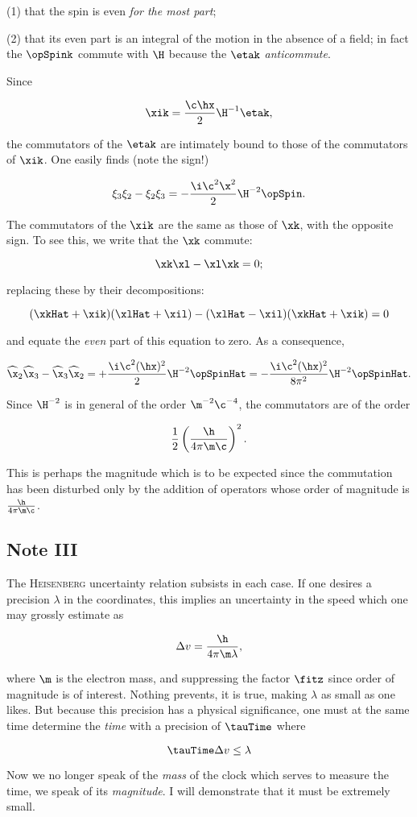 \documentclass{article}
\newcommand{\nc}[2]{
  \newcommand{#1}{#2}
}
\newcommand{\rc}[2]{
  \renewcommand{#1}{#2}
}
\newcommand{\uequ}[1]{
\begin{equation*}
#1
\end{equation*}
}
\newcommand{\var}[1]{#1}
\newcommand{\inv}[1]{\frac{1}{#1}}
\newcommand{\opinv}[1]{{#1}^{-1}}
\newcommand{\hatted}[1]{\widehat{#1}}
\renewcommand{\it}[1]{\textit{#1}}
\renewcommand{\sc}[1]{\textsc{#1}}
\newcommand{\xiX}[1]{\var{\xi}_{#1}}
\begin{document}
(1) that the spin is even \it{for the most part};

(2) that its even part is an integral of the motion in the absence of a field; in fact the $\opSpink$ commute with $\H$ because the $\etak$ \it{anticommute}.

Since
\uequ{
\xik=\frac{\c\hx}{2}\opinv{\H}\etak,
}
the commutators of the $\etak$ are intimately bound to those of the commutators of $\xik$. One easily finds (note the sign!)
\uequ{
\xiX{3}\xiX{2} - \xiX{2}\xiX{3} = -\frac{\i\c^2\x^2}{2}\H^{-2}\opSpin.
}

The commutators of the $\xik$ are the same as those of $\xk$, with the opposite sign. To see this, we write that the $\xk$ commute:
\uequ{
\xk\xl - \xl\xk = 0;
}
replacing these by their decompositions:
\uequ{
(\xkHat + \xik)(\xlHat + \xil) - (\xlHat - \xil)(\xkHat + \xik)=0
}
and equate the \it{even} part of this equation to zero. As a consequence,

\newcommand{\xXHat}[1]{\hatted{\x}_{#1}}

\uequ{
\xXHat{2}\xXHat{3} - \xXHat{3}\xXHat{2} = +\frac{\i\c^2(\hx)^2}{2}\H^{-2}\opSpinHat
 = -\frac{\i\c^2(\hx)^2}{8\pi^2}\H^{-2}\opSpinHat.
}
Since $\H^{-2}$ is in general of the order $\m^{-2}\c^{-4}$, the commutators are of the order
\uequ{
\inv{2}\left(\frac{\h}{4\pi\m\c}\right)^2.
}

This is perhaps the magnitude which is to be expected since the commutation has been disturbed only by the addition of operators whose order of magnitude is $\frac{\h}{4\pi\m\c}$.

\subsection{Note III}

\rc{\v}{\var{v}}
\nc{\lam}{\var{\lambda}}

The \sc{Heisenberg} uncertainty relation subsists in each case. If one desires a precision $\lam$ in the coordinates, this implies an uncertainty in the speed which one may grossly estimate as
\uequ{
\Delta\v = \frac{\h}{4\pi\m\lam},
}
where $\m$ is the electron mass, and suppressing the factor $\fitz$ since order of magnitude is of interest. Nothing prevents, it is true, making $\lam$ as small as one likes. But because this precision has a physical significance, one must at the same time determine the \it{time} with a precision of $\tauTime$ where
\uequ{
\tauTime\Delta\v \leq \lam
}

Now we no longer speak of the \it{mass} of the clock which serves to measure the time, we speak of its \it{magnitude}. I will demonstrate that it must be extremely small.
\end{document}
